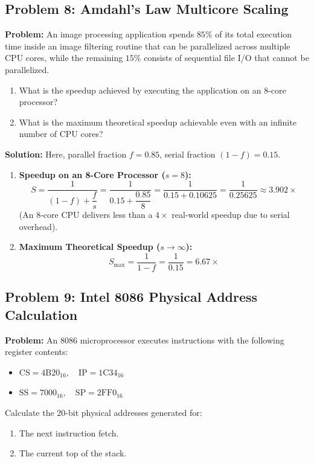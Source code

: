 \subsection{Problem 8: Amdahl's Law Multicore Scaling}
\textbf{Problem:} An image processing application spends $85\%$ of its total execution time inside an image filtering routine that can be parallelized across multiple CPU cores, while the remaining $15\%$ consists of sequential file I/O that cannot be parallelized.
\begin{enumerate}[label=\bfseries\alph*.]
    \item What is the speedup achieved by executing the application on an 8-core processor?
    \item What is the maximum theoretical speedup achievable even with an infinite number of CPU cores?
\end{enumerate}

\textbf{Solution:}
Here, parallel fraction $f = 0.85$, serial fraction $(1 - f) = 0.15$.
\begin{enumerate}[label=\bfseries\alph*.]
    \item \textbf{Speedup on an 8-Core Processor ($s = 8$):}
    \[ S = \frac{1}{(1 - f) + \dfrac{f}{s}} = \frac{1}{0.15 + \dfrac{0.85}{8}} = \frac{1}{0.15 + 0.10625} = \frac{1}{0.25625} \approx \mathbf{3.902\times} \]
    (An 8-core CPU delivers less than a $4\times$ real-world speedup due to serial overhead).
    \item \textbf{Maximum Theoretical Speedup ($s \to \infty$):}
    \[ S_{\text{max}} = \frac{1}{1 - f} = \frac{1}{0.15} = \mathbf{6.67\times} \]
\end{enumerate}

\subsection{Problem 9: Intel 8086 Physical Address Calculation}
\textbf{Problem:} An 8086 microprocessor executes instructions with the following register contents:
\begin{itemize}
    \item $\text{CS} = 4\text{B}20_{16}, \quad \text{IP} = 1\text{C}34_{16}$
    \item $\text{SS} = 7000_{16}, \quad \text{SP} = 2\text{FF}0_{16}$
\end{itemize}
Calculate the 20-bit physical addresses generated for:
\begin{enumerate}[label=\bfseries\alph*.]
    \item The next instruction fetch.
    \item The current top of the stack.
\end{enumerate}

